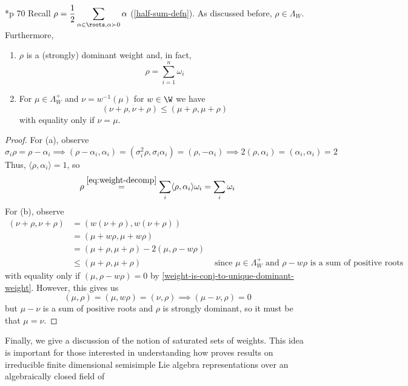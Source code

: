 \documentclass[11pt,leqno,oneside]{amsart}
\numberwithin{thm}{section}
\newcommand{\weightlattice}{\Lambda_W}
\newcommand{\halfsum}{\rho}
\begin{document}
\begin{prop}
  \cite{humph}*{p 70} Recall \(\displaystyle \halfsum = \frac{1}{2} \sum_{\alpha \in \roots, \alpha \succ
    0} \alpha\) (\ref{half-sum-defn}). As discussed before, \(\halfsum
  \in \weightlattice\). Furthermore,
  \begin{enumerate}
  \item \(\halfsum\) is a (strongly) dominant weight and, in fact, \[
      \halfsum = \sum_{i=1}^n \omega_i
    \]
  \item For \(\mu \in \weightlattice^+\) and \(\nu = w^{-1}(\mu)\) for
    \(w \in \W\) we have \[
      (\nu+\halfsum,\nu+\halfsum) \leq (\mu+\halfsum, \mu+\halfsum)
    \] with equality only if
    \(\nu=\mu\). 
  \end{enumerate}
\end{prop}
\begin{proof}
  For (a), observe \[
    \sigma_i \halfsum = \halfsum-\alpha_i \implies (\halfsum-\alpha_i,
    \alpha_i) = (\sigma_i^2 \halfsum, \sigma_i \alpha_i) = (\halfsum,
    -\alpha_i) \implies 2(\halfsum, \alpha_i) = (\alpha_i,\alpha_i) = 2
  \]
  Thus, \(\langle \halfsum, \alpha_i \rangle = 1\), so \[
    \halfsum \overset{\ref{eq:weight-decomp}}{=} \sum_i \langle \halfsum, \alpha_i \rangle \omega_i =
    \sum_i \omega_i
  \]
  For (b), observe
  \begin{align*}
    (\nu+\halfsum,\nu+\halfsum)
    & = (w(\nu+\halfsum), w(\nu+\halfsum)) \\
    & = (\mu+w\halfsum, \mu+w\halfsum) \\
    & = (\mu + \halfsum, \mu + \halfsum) - 2(\mu, \halfsum-w\halfsum)
    \\
    & \leq (\mu+\halfsum, \mu+\halfsum)
      & \text{ since }\mu \in \weightlattice^+ \text{ and } \halfsum -
        w\halfsum \text{ is a sum of positive roots}
  \end{align*}
  with equality only if \((\mu, \halfsum-w\halfsum) = 0\) by
  \ref{weight-is-conj-to-unique-dominant-weight}.  However, this gives us \[
    (\mu,\halfsum) = (\mu, w\halfsum) = (\nu, \halfsum) \implies
    (\mu-\nu,\halfsum) = 0
  \]
  but \(\mu-\nu\) is a sum of positive roots and \(\halfsum\) is
  strongly dominant, so it must be that \(\mu=\nu\).
\end{proof}
Finally, we give a discussion of the notion of saturated sets of
weights. This idea is important for those interested in understanding
how \cite{humph} proves results on irreducible finite dimensional
semisimple Lie
algebra representations over an algebraically closed field of
\end{document}
